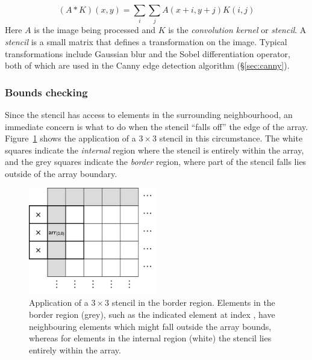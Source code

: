 \begin{equation*}
    (A * K)(x, y) = \sum_i \sum_j A(x+i, y+j) K(i,j)
\end{equation*}
%
Here $A$ is the image being processed and $K$ is the \emph{convolution kernel}
or \emph{stencil}. A \emph{stencil} is a small matrix that defines a
transformation on the image. Typical transformations include Gaussian blur and
the Sobel differentiation operator, both of which are used in the Canny edge
detection algorithm (\S\ref{sec:canny}).


\subsubsection{Bounds checking}

Since the stencil has access to elements in the surrounding neighbourhood, an
immediate concern is what to do when the stencil ``falls off'' the edge of the
array. Figure~\ref{fig:stencil3x3} shows the application of a $3\times3$ stencil
in this circumstance. The white squares indicate the \emph{internal} region
where the stencil is entirely within the array, and the grey squares indicate
the \emph{border} region, where part of the stencil falls lies outside of the
array boundary.

\begin{figure}[tbp]
    \begin{center}
        \includegraphics[width=0.5\textwidth]{images/sec-4/stencil3x3}
    \end{center}
    \caption[Application of a $3\times3$ stencil in the border region]
        {Application of a $3\times3$ stencil in the border region. Elements in
        the border region (grey), such as the indicated element at index
        , have neighbouring elements which might fall outside
        the array bounds, whereas for elements in the internal region (white)
        the stencil lies entirely within the array.}
    \label{fig:stencil3x3}
\end{figure}

